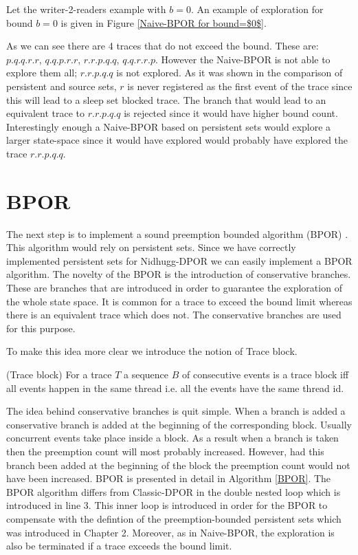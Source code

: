 Let the writer-2-readers example with $b=0$. An example of exploration for bound $b=0$ is given in Figure \ref{Naive-BPOR for bound=$0$}. 

\label{Vanilla0}    

As we can see there are 4 traces that do not exceed the bound. These are:
$p.q.q.r.r$, $q.q.p.r.r$, $r.r.p.q.q$, $q.q.r.r.p$.
However the Naive-BPOR is not able to explore them all; $r.r.p.q.q$ is not explored.
As it was shown in the comparison of persistent and source sets, $r$ is never registered as the first event of the trace
since this will lead to a sleep set blocked trace. The branch that would lead to an equivalent trace to $r.r.p.q.q$ is rejected
since it would have higher bound count. Interestingly enough a Naive-BPOR based on persistent sets would explore a larger state-space since
it would have explored would probably have explored the trace $r.r.p.q.q$.

\section{BPOR}

The next step is to implement a sound preemption bounded algorithm (BPOR) \cite{BPOR}. This algorithm would rely on persistent sets.
Since we have correctly implemented persistent sets for Nidhugg-DPOR we can easily implement a BPOR algorithm. The novelty of the BPOR is the introduction of conservative branches. These
are branches that are introduced in order to guarantee the exploration of the whole state space. It is common for a trace to exceed the bound limit whereas there is
an equivalent trace which does not. The conservative branches are used for this purpose.

To make this idea more clear we introduce the notion of Trace block.
\begin{definition}{(Trace block)}
For a trace $T$ a sequence $B$ of consecutive events is a trace block iff all events happen in the same thread i.e. all the events have the same thread id.
\end{definition}

The idea behind conservative branches is quit simple. When a branch is added a conservative branch is added at the beginning of the corresponding block.
Usually concurrent events take place inside a block. As a result when a branch is taken then the preemption count will most probably increased. However, had this
branch been added at the beginning of the block the preemption count would not have been increased. BPOR is presented in detail in Algorithm \ref{BPOR}.
The BPOR algorithm differs from Classic-DPOR in the double nested loop which is introduced in line 3. This inner loop is introduced in order for the BPOR to
compensate with the defintion of the preemption-bounded persistent sets which was introduced in Chapter 2. Moreover, as in Naive-BPOR, the exploration is also be 
terminated if a trace exceeds the bound limit.

